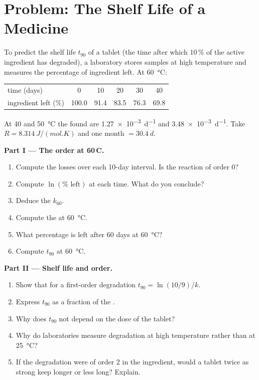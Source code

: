 \section{Problem: The Shelf Life of a Medicine}

\begin{problem}
\label{pb:b1:rate-laws:1}
To predict the shelf life $t_{90}$ of a tablet (the time after which 10\,\%
of the active ingredient has degraded), a laboratory stores samples at
high temperature and measures the percentage of ingredient left. At
\qty{60}{\celsius}:
\begin{center}
\begin{tabular}{lccccc}
\hline
time (days) & 0 & 10 & 20 & 30 & 40 \\
ingredient left (\%) & 100.0 & 91.4 & 83.5 & 76.3 & 69.8 \\
\hline
\end{tabular}
\end{center}
At 40 and \qty{50}{\celsius} the  found are
\qty{1.27e-3}{d^{-1}} and \qty{3.48e-3}{d^{-1}}. Take $R =
\qty{8.314}{J/(mol.K)}$ and one month $= \qty{30.4}{d}$.

\medskip
\noindent\textbf{Part I --- The order at 60\,\textdegree C.}
\begin{enumerate}
  \item Compute the losses over each 10-day interval. Is the reaction of
        order 0?
  \item Compute $\ln(\%\text{ left})$ at each time. What do you conclude?
  \item Deduce the  $k_{60}$.
  \item Compute the  at \qty{60}{\celsius}.
  \item What percentage is left after 60 days at \qty{60}{\celsius}?
  \item Compute $t_{90}$ at \qty{60}{\celsius}.
\end{enumerate}

\medskip
\noindent\textbf{Part II --- Shelf life and order.}
\begin{enumerate}[resume]
  \item Show that for a first-order degradation $t_{90} = \ln(10/9)/k$.
  \item Express $t_{90}$ as a fraction of the .
  \item Why does $t_{90}$ not depend on the dose of the tablet?
  \item Why do laboratories measure degradation at high temperature
        rather than at \qty{25}{\celsius}?
  \item If the degradation were of order 2 in the ingredient, would a
        tablet twice as strong keep longer or less long? Explain.
\end{enumerate}


\end{problem}
